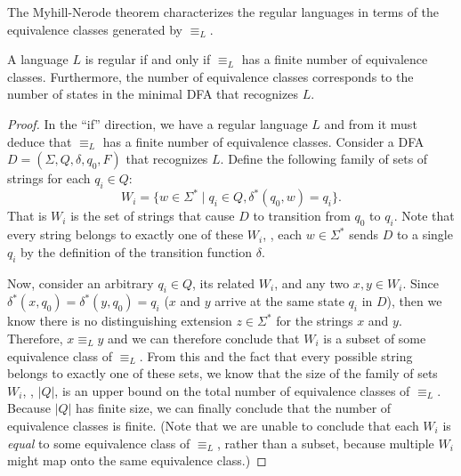 \documentclass[11pt]{book}
\begin{document}
The Myhill-Nerode theorem characterizes the regular languages in terms of the equivalence classes generated by $\equiv_L$.
\begin{thm}
A language $L$ is regular if and only if $\equiv_L$ has a finite number of equivalence classes.
Furthermore, the number of equivalence classes corresponds to the number of states in the minimal DFA that recognizes $L$.
\end{thm}
\begin{proof}
  In the ``if'' direction, we have a regular language $L$ and from it must deduce that $\equiv_L$ has a finite number of equivalence classes.
  Consider a DFA $D = (\Sigma, Q, \delta, q_0, F)$ that recognizes $L$.
  Define the following family of sets of strings for each $q_i \in Q$:
  \[
    W_i = \{ w \in \Sigma^* \;|\; q_i \in Q, \delta^*(q_0, w) = q_i \}.
  \]
  That is $W_i$ is the set of strings that cause $D$ to transition from $q_0$ to $q_i$.
  Note that every string belongs to exactly one of these $W_i$, \ie, each $w \in \Sigma^*$ sends $D$ to a single $q_i$ by the definition of the transition function $\delta$.

  Now, consider an arbitrary $q_i \in Q$, its related $W_i$, and any two $x, y \in W_i$.
  Since $\delta^*(x, q_0) = \delta^*(y, q_0) = q_i$ ($x$ and $y$ arrive at the same state $q_i$ in $D$), then we know there is no distinguishing extension $z \in \Sigma^*$ for the strings $x$ and $y$.
  Therefore, $x \equiv_L y$ and we can therefore conclude that $W_i$ is a subset of some equivalence class of $\equiv_L$.
  From this and the fact that every possible string belongs to exactly one of these sets, we know that the size of the family of sets $W_i$, \ie, $|Q|$, is an upper bound on the total number of equivalence classes of $\equiv_L$.
  Because $|Q|$ has finite size, we can finally conclude that the number of equivalence classes is finite.
  (Note that we are unable to conclude that each $W_i$ is \emph{equal} to some equivalence class of $\equiv_L$, rather than a subset, because multiple $W_i$ might map onto the same equivalence class.)


\end{proof}
\end{document}
